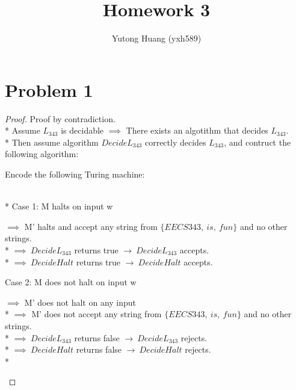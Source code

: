 \documentclass{article}
\title{\vspace{-3cm}Homework 3}
\author{Yutong Huang (yxh589)}
\date{}
\begin{document}
    \maketitle
    \section*{Problem 1}
    \begin{proof}
        Proof by contradiction.\\*
        Assume $L_{343}$ is decidable $\implies$ There exists an algotithm that decides $L_{343}$. \\*
        Then assume algorithm $ DecideL_{343} $ correctly decides $ L_{343} $, and contruct the following algorithm:
        \begin{algorithm}
            \DontPrintSemicolon
            \caption{$DecideHalt$}

            Encode the following Turing machine:\;
        \end{algorithm}\\*
        Case 1: M halts on input w
        \begin{addmargin}[2em]{0em}
            $\implies$ M' halts and accept any string from $\{EECS343,\ is,\ fun\}$ and no other strings.\\*
            $\implies\ DecideL_{343}$ returns true $\rightarrow\ DecideL_{343}$ accepts.\\*
            $ \implies\ DecideHalt$ returns true $\rightarrow\ DecideHalt$ accepts.   
        \end{addmargin}
        Case 2: M does not halt on input w
        \begin{addmargin}[2em]{0em}
            $\implies$ M' does not halt on any input\\*
            $\implies$ M' does not accept any string from $\{EECS343,\ is,\ fun\}$ and no other strings.\\*
            $\implies\ DecideL_{343}$ returns false $\rightarrow\ DecideL_{343}$ rejects.\\*
            $ \implies\ DecideHalt$ returns false $\rightarrow\ DecideHalt$ rejects.\\*
        \end{addmargin}


\end{proof}
\end{document}
